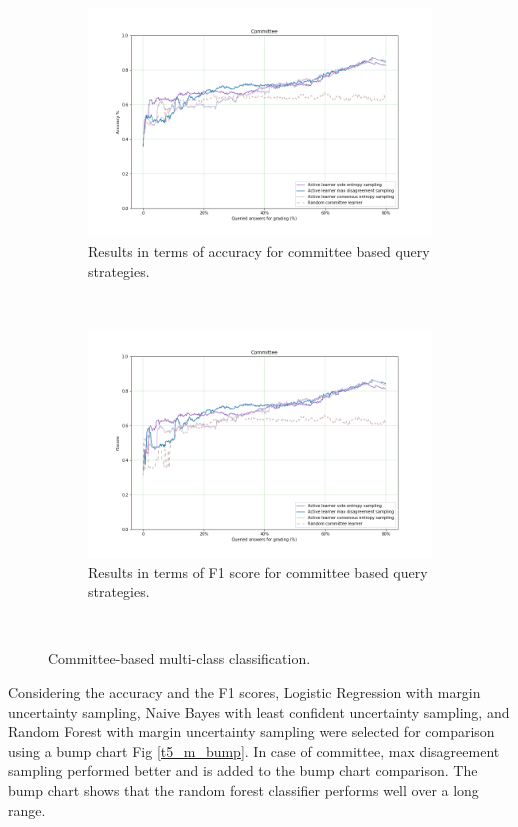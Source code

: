 \begin{figure}[!htb]
	\begin{subfigure}[b]{0.5\textwidth}
		\includegraphics[width=\textwidth]{images/task5_accuracy_com}
		\caption{Results in terms of accuracy for committee based query strategies.}
		\label{t5_m_com}
	\end{subfigure}
	~
	\begin{subfigure}[b]{0.5\textwidth}
		\includegraphics[width=\textwidth]{images/task5_f1score_com}
		\caption{Results in terms of F1 score for committee based query strategies.}
		\label{t5_m_com_f1}
	\end{subfigure}
	~
	\caption{Committee-based multi-class classification.}
\end{figure}

Considering the accuracy and the F1 scores, Logistic Regression with margin uncertainty sampling, Naive Bayes with least confident uncertainty sampling, and Random Forest with margin uncertainty sampling were selected for comparison using a bump chart Fig \ref{t5_m_bump}. In case of committee, max disagreement sampling performed better and is added to the bump chart comparison. The bump chart shows that the random forest classifier performs well over a long range.

